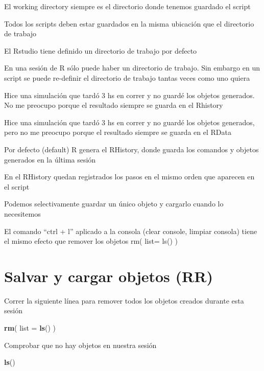 \documentclass[]{book}
\newenvironment{Shaded}{\begin{snugshade}}{\end{snugshade}}
\newcommand{\DataTypeTok}[1]{\textcolor[rgb]{0.13,0.29,0.53}{#1}}
\newcommand{\KeywordTok}[1]{\textcolor[rgb]{0.13,0.29,0.53}{\textbf{#1}}}
\newcommand{\NormalTok}[1]{#1}
\begin{document}
El working directory siempre es el directorio donde tenemos guardado el script

Todos los scripts deben estar guardados en la misma ubicación que el directorio de trabajo

El Rstudio tiene definido un directorio de trabajo por defecto

En una sesión de R sólo puede haber un directorio de trabajo. Sin embargo en un script se puede re-definir el directorio de trabajo tantas veces como uno quiera

Hice una simulación que tardó 3 hs en correr y no guardé los objetos generados. No me preocupo porque el resultado siempre se guarda en el Rhistory

Hice una simulación que tardó 3 hs en correr y no guardé los objetos generados, pero no me preocupo porque el resultado siempre se guarda en el RData

Por defecto (default) R genera el RHistory, donde guarda los comandos y objetos generados en la última sesión

En el RHistory quedan registrados los pasos en el mismo orden que aparecen en el script

Podemos selectivamente guardar un único objeto y cargarlo cuando lo necesitemos

El comando ``ctrl + l'' aplicado a la consola (clear console, limpiar consola) tiene el mismo efecto que remover los objetos rm( list= ls() )

\hypertarget{salvar-y-cargar-objetos-rr}{%
\section{Salvar y cargar objetos (RR)}\label{salvar-y-cargar-objetos-rr}}

Correr la siguiente línea para remover todos los objetos creados durante esta sesión

\begin{Shaded}
\begin{Highlighting}[]
\KeywordTok{rm}\NormalTok{( }\DataTypeTok{list =} \KeywordTok{ls}\NormalTok{() )}
\end{Highlighting}
\end{Shaded}

Comprobar que no hay objetos en nuestra sesión

\begin{Shaded}
\begin{Highlighting}[]
\KeywordTok{ls}\NormalTok{()}
\end{Highlighting}
\end{Shaded}
\end{document}
